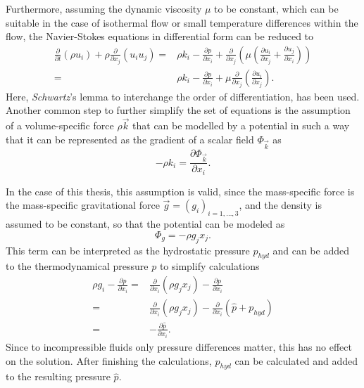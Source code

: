 Furthermore, assuming the dynamic viscosity \(\mu\) to be constant, which can be suitable in the case of isothermal flow or small temperature differences within the flow, the Navier-Stokes equations in differential form can be reduced to 
\begin{subequations}
\label{eq:navierstokes}
\begin{align}
  \frac{\partial}{\partial t}   \left(\rho u_i \right)
  + \rho \frac{\partial}{\partial x_j} \left( u_i  u_j \right) 
  =& \rho k_i
  - \frac{\partial p}{\partial x_i}
+ \frac{\partial}{\partial x_j} \left( \mu  \left( \frac{\partial u_i}{\partial x_j} 
+ \frac{\partial u_j}{\partial x_i} \right) \right) \\[0.5em]
  =& \rho k_i
  - \frac{\partial p}{\partial x_i}
  + \mu \frac{\partial}{\partial x_j} \left( \frac{\partial u_i}{\partial x_j} \right).
\end{align}
\end{subequations}
Here, \emph{Schwartz}'s lemma to interchange the order of differentiation, has been used. Another common step to further simplify the set of equations is the assumption of a volume-specific force \(\rho \vec{k}\) that can be modelled by a potential in such a way that it can be represented as the gradient of a scalar field \(\Phi_\vec{k}\) as
\begin{displaymath}
 - \rho k_i = \frac{\partial \Phi_\vec{k}}{\partial x_i}.
\end{displaymath}

In the case of this thesis, this assumption is valid, since the mass-specific force is the mass-specific gravitational force \(\vec{g} = \left( g_i \right)_{i = 1,\dots,3}\), and the density is assumed to be constant, so that the potential can be modeled as
\begin{displaymath}
  \Phi_g = - \rho g_j x_j.
\end{displaymath}
This term can be interpreted as the hydrostatic pressure \(p_{hyd}\) and can be added to the thermodynamical pressure \(p\) to simplify calculations 
\begin{align*}
  \rho g_i - \frac{\partial p}{\partial x_i} 
  =& \frac{\partial}{\partial x_i} \left( \rho g_j x_j \right) - \frac{\partial p}{\partial x_i} \nonumber \\[0.5em]
  =& \frac{\partial}{\partial x_i} \left( \rho g_j x_j \right) - \frac{\partial}{\partial x_i}  \left(\hat{p} + p_{hyd} \right) \nonumber \\[0.5em]
  =& - \frac{\partial \hat{p}}{\partial x_i}.
\end{align*}
Since to incompressible fluids only pressure differences matter, this has no effect on the solution. After finishing the calculations, \(p_{hyd}\) can be calculated and added to the resulting pressure \(\hat{p}\).

